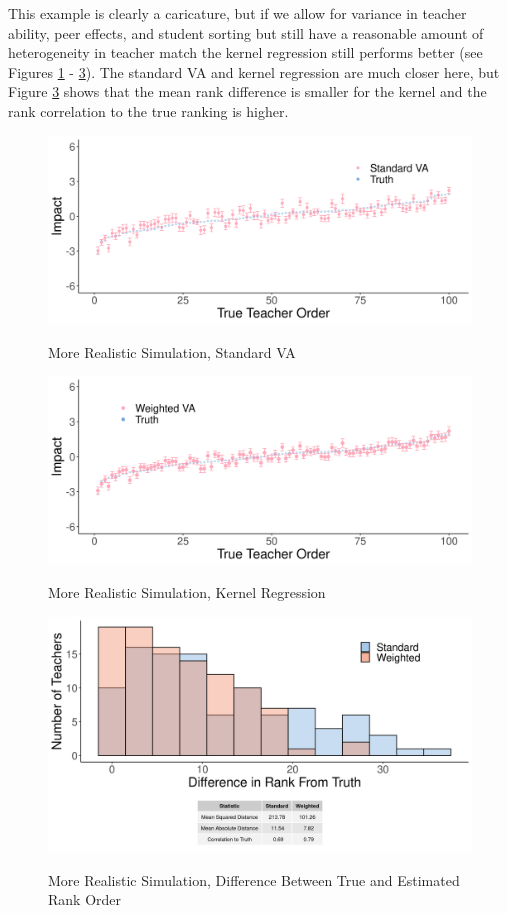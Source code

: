 \documentclass[letterpaper,12pt]{article}
\begin{document}
This example is clearly a caricature, but if we allow for variance in teacher ability, peer effects, and student sorting but still have a reasonable amount of heterogeneity in teacher match the kernel regression still performs better (see Figures \ref{fig:stand_cat10} - \ref{fig:hist}). The standard VA and kernel regression are much closer here, but Figure \ref{fig:hist} shows that the mean rank difference is smaller for the kernel and the rank correlation to the true ranking is higher.

\begin{figure}[ht]
    \centering
    \caption{More Realistic Simulation, Standard VA}
    \includegraphics[width=.9\textwidth]{slides/CIERS_Figures/standard_cat_run_2_new.png}
    \label{fig:stand_cat10}
\end{figure}

\begin{figure}[ht]
    \centering
    \caption{More Realistic Simulation, Kernel Regression}
    \includegraphics[width=.9\textwidth]{slides/CIERS_Figures/np_ww_cat_run_2.png}
    \label{fig:alt_cat10}
\end{figure}

\begin{figure}[ht]
    \centering
    \caption{More Realistic Simulation, Difference Between True and Estimated Rank Order}
    \includegraphics[width=.9\textwidth]{slides/CIERS_Figures/np_hist_run_2.png}
    \label{fig:hist}
\end{figure}







\end{document}
